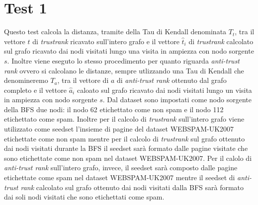 \section{Test 1}
 Questo test calcola la distanza, tramite della Tau di Kendall denominata \(T_t\), tra il vettore \(t\) di \textit{trustrank} ricavato sull'intero grafo e il vettore \(\hat{t}_i\) di \textit{trustrank} calcolato sul grafo ricavato dai nodi visitati lungo una visita in ampiezza con nodo sorgente \(s\). Inoltre viene eseguto lo stesso procedimento per quanto riguarda \textit{anti-trust rank} ovvero si calcolano le distanze, sempre utlizzando una Tau di Kendall che denomineremo \(T_a\),  tra il vettore di \(a\) di \textit{anti-trust rank} ottenuto dal grafo completo e il vettore \(\hat{a}_i\)  caloato sul grafo ricavato dai nodi visitati lungo  un visita in ampiezza con nodo sorgente \(s\). Dal dataset sono impostati come nodo sorgente della BFS due nodi: il nodo 62 etichettato come non spam e il nodo 112 etichettato come spam. Inoltre per il calcolo di \textit{trustrank} sull'intero grafo viene utilizzato come seedset l'insieme di pagine del dataset WEBSPAM-UK2007 etichettate come non spam mentre per il 
calcolo di \textit{trustrank} sul grafo ottenuto dai nodi visitati durante la BFS il seedset sarà formato dalle pagine visitate che sono etichettate come non spam nel dataset WEBSPAM-UK2007. Per il calolo di \textit{anti-trust rank} sull'intero grafo, invece, il seedset sarà composto dalle pagine etichettate come spam nel dataset WEBSPAM-UK2007 mentre il seedset di \textit{anti-trust rank} calcolato sul grafo ottenuto dai nodi visitati dalla BFS sarà formato dai soli nodi visitati che sono etichettati come spam.

